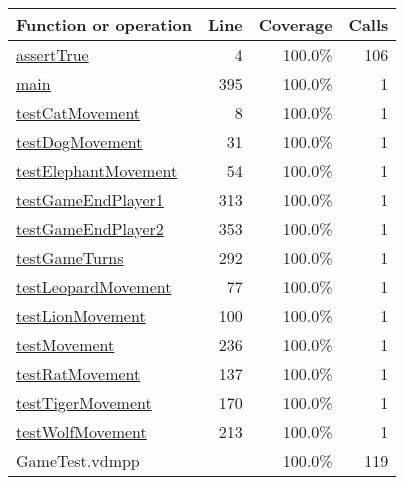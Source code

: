 \bigskip
\begin{longtable}{|l|r|r|r|}
\hline
Function or operation & Line & Coverage & Calls \\
\hline
\hline
\hyperref[assertTrue:4]{assertTrue} & 4&100.0\% & 106 \\
\hline
\hyperref[main:395]{main} & 395&100.0\% & 1 \\
\hline
\hyperref[testCatMovement:8]{testCatMovement} & 8&100.0\% & 1 \\
\hline
\hyperref[testDogMovement:31]{testDogMovement} & 31&100.0\% & 1 \\
\hline
\hyperref[testElephantMovement:54]{testElephantMovement} & 54&100.0\% & 1 \\
\hline
\hyperref[testGameEndPlayer1:313]{testGameEndPlayer1} & 313&100.0\% & 1 \\
\hline
\hyperref[testGameEndPlayer2:353]{testGameEndPlayer2} & 353&100.0\% & 1 \\
\hline
\hyperref[testGameTurns:292]{testGameTurns} & 292&100.0\% & 1 \\
\hline
\hyperref[testLeopardMovement:77]{testLeopardMovement} & 77&100.0\% & 1 \\
\hline
\hyperref[testLionMovement:100]{testLionMovement} & 100&100.0\% & 1 \\
\hline
\hyperref[testMovement:236]{testMovement} & 236&100.0\% & 1 \\
\hline
\hyperref[testRatMovement:137]{testRatMovement} & 137&100.0\% & 1 \\
\hline
\hyperref[testTigerMovement:170]{testTigerMovement} & 170&100.0\% & 1 \\
\hline
\hyperref[testWolfMovement:213]{testWolfMovement} & 213&100.0\% & 1 \\
\hline
\hline
GameTest.vdmpp & & 100.0\% & 119 \\
\hline
\end{longtable}

